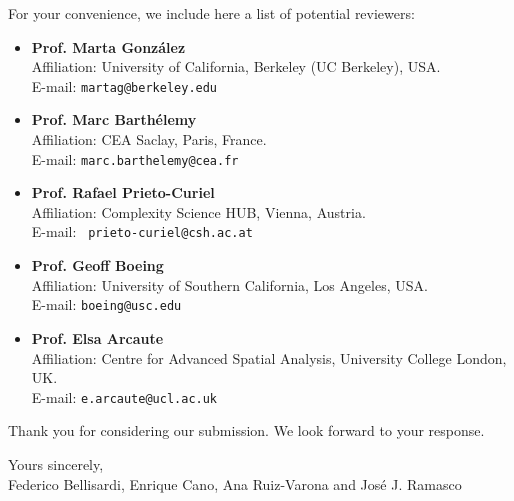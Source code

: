 \documentclass{article}
\begin{document}
For your convenience, we include here a list of potential reviewers:

\begin{itemize}
    \item \textbf{Prof. Marta González} \\
    Affiliation: University of California, Berkeley (UC Berkeley), USA. \\
    E-mail: \texttt{martag@berkeley.edu}
    
    \item \textbf{Prof. Marc Barth\'elemy} \\
    Affiliation: CEA Saclay, Paris, France. \\
    E-mail: \texttt{marc.barthelemy@cea.fr}
    
    \item \textbf{Prof. Rafael Prieto-Curiel} \\
    Affiliation: Complexity Science HUB, Vienna, Austria. \\
    E-mail: \texttt{ prieto-curiel@csh.ac.at }
    
    \item \textbf{Prof. Geoff Boeing} \\
    Affiliation: University of Southern California, Los Angeles, USA. \\
    E-mail: \texttt{boeing@usc.edu}
    
    \item \textbf{Prof. Elsa Arcaute} \\
    Affiliation: Centre for Advanced Spatial Analysis, University College London, UK. \\
    E-mail: \texttt{e.arcaute@ucl.ac.uk}
\end{itemize}
 \smallskip
Thank you for considering our submission. We look forward to your response. 

\vspace{0.5cm}

Yours sincerely,\\

Federico Bellisardi, Enrique Cano, Ana Ruiz-Varona and Jos\'e J. Ramasco

\vspace{1cm}
\end{document}
